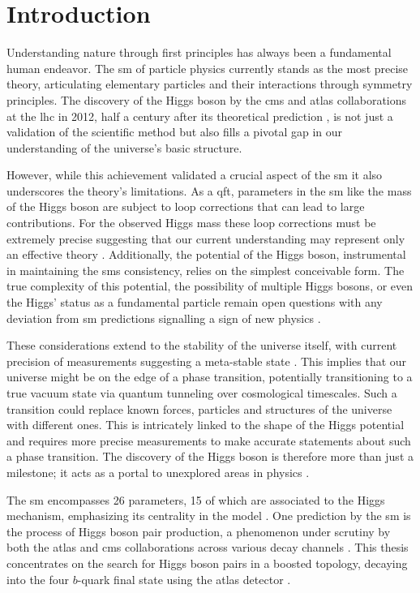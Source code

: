 \chapter{Introduction}
Understanding nature through first principles has always been a fundamental human endeavor. The \ac{sm} of particle physics currently stands as the most precise theory, articulating elementary particles and their interactions through symmetry principles. The discovery of the Higgs boson by the \ac{cms} \citep{higgs-cms} and \ac{atlas} \citep{higgs} collaborations at the \ac{lhc} in 2012, half a century after its theoretical prediction \citep{PhysRevLett.13.321,PhysRevLett.13.508}, is not just a validation of the scientific method but also fills a pivotal gap in our understanding of the universe's basic structure.

However, while this achievement validated a crucial aspect of the \ac{sm} it also underscores the  theory's limitations. As a \ac{qft}, parameters in the \ac{sm} like the mass of the Higgs boson  are subject to loop corrections that can lead to large contributions. For the observed Higgs mass these loop corrections must be extremely precise suggesting that our current understanding may represent only an effective theory \citep{peskin2016trail}. Additionally, the potential of the Higgs boson, instrumental in maintaining the \acp{sm} consistency, relies on the simplest conceivable form. The true complexity of this potential, the possibility of multiple Higgs bosons, or even the Higgs' status as a fundamental particle remain open questions with any deviation from \ac{sm} predictions signalling a sign of new physics \citep{PhysRevD.101.075023}.

These considerations extend to the stability of the universe itself, with current precision of measurements suggesting a meta-stable state \citep{Buttazzo:2013uya,devoto2022false}. This implies that our universe might be on the edge of a phase transition, potentially transitioning to a true vacuum state via quantum tunneling over cosmological timescales. Such a transition could replace known forces, particles and structures of the universe with different ones. This is intricately linked to the shape of the Higgs potential and requires more precise measurements to make accurate statements about such a phase transition. The discovery of the Higgs boson is therefore more than just a milestone; it acts as a portal to unexplored areas in physics \citep{dawsona2022report}.

The \ac{sm} encompasses 26 parameters, 15 of which are associated to the Higgs mechanism, emphasizing its centrality in the model \citep{thomson2013modern}. One prediction by the \ac{sm} is the process of Higgs boson pair production, a phenomenon under scrutiny by both the \ac{atlas} and \ac{cms} collaborations across various decay channels \citep{GOUZEVITCH2020100039}. This thesis concentrates on the search for Higgs boson pairs in a boosted topology, decaying into the four $b$-quark final state using the \ac{atlas} detector \citep{atlas2018search}.


